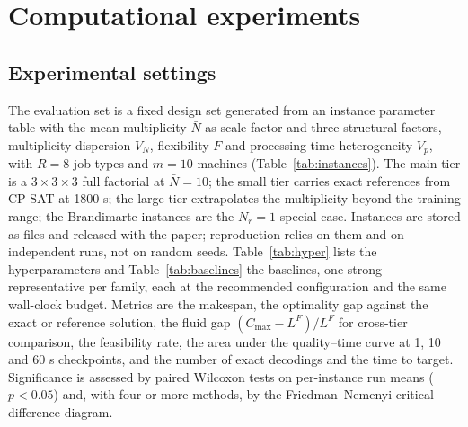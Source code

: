 \section{Computational experiments}\label{sec:experiments}


\subsection{Experimental settings}\label{sec:settings}
The evaluation set is a fixed design set generated from an instance parameter table with the mean multiplicity $\bar N$ as scale
factor and three structural factors, multiplicity dispersion $V_N$, flexibility $F$ and processing-time heterogeneity $V_p$,
with $R = 8$ job types and $m = 10$ machines (Table~\ref{tab:instances}). The main tier is a $3\times3\times3$ full
factorial at $\bar N = 10$; the small tier carries exact references from CP-SAT \cite{ortools} at 1800 s; the large tier
extrapolates the multiplicity beyond the training range; the Brandimarte instances \cite{brandimarte1993routing} are the
$N_r = 1$ special case. Instances are stored as files and released with the paper; reproduction relies on them and on
\NumRuns{} independent runs, not on random seeds. Table~\ref{tab:hyper} lists the hyperparameters and
Table~\ref{tab:baselines} the baselines, one strong representative per family, each at the recommended configuration and the
same wall-clock budget. Metrics are the makespan, the optimality gap against the exact or reference solution, the fluid gap
$(C_{\max} - L^F)/L^F$ for cross-tier comparison, the feasibility rate, the area under the quality--time curve at 1, 10 and 60 s
checkpoints, and the number of exact decodings and the time to target. Significance is assessed by paired Wilcoxon tests on
per-instance run means ($p < 0.05$) and, with four or more methods, by the Friedman--Nemenyi critical-difference diagram.

\begin{table}
\centering\small
\caption{Evaluation instance set.}\label{tab:instances}

\end{table}

